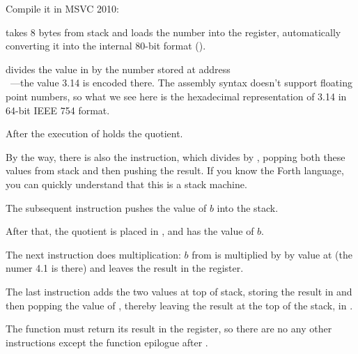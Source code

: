 
Compile it in MSVC 2010:



\FLD takes 8 bytes from stack and loads the number into the  register, automatically converting 
it into the internal 80-bit format ().


\FDIV divides the value in  by the number stored at address \\
~---the value 3.14 is encoded there. 
The assembly syntax doesn't support floating point numbers, so 
what we see here is the hexadecimal representation of 3.14 in 64-bit IEEE 754 format.

After the execution of \FDIV {} holds the \gls{quotient}.


By the way, there is also the \FDIVP instruction, which divides  by , 
popping both these values from stack and then pushing the result. 
If you know the Forth language\FNURLFORTH,
you can quickly understand that this is a stack machine\FNURLSTACK.

The subsequent \FLD instruction pushes the value of $b$ into the stack.

After that, the quotient is placed in , and  has the value of $b$.


The next \FMUL instruction does multiplication: $b$ from  is multiplied by by value at 
 (the numer 4.1 is there) and leaves the result in the  register.


The last \FADDP instruction adds the two values at top of stack, storing the result in  
and then popping the value of , thereby leaving the result at the top of the stack, in .

The function must return its result in the  register, 
so there are no any other instructions except the function epilogue after \FADDP.


